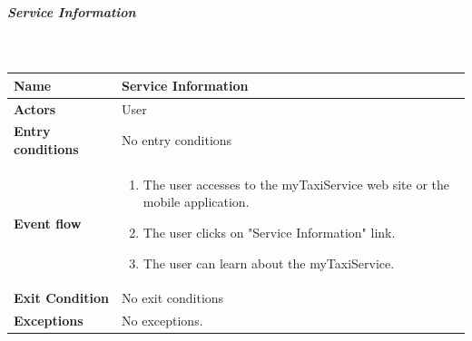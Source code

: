 		\newpage
		\subparagraph{Service Information}
		~\\[0.2cm]
		\vspace{20pt}
		\noindent
		\begin{tabular}{l l}
		 \textbf {Name} & Service Information  \\ \hline
		 \textbf{Actors} & User \\ \hline
		 \textbf{Entry conditions} & No entry conditions \\ \hline
		 \textbf{Event flow} & 
		 \parbox{0.7\textwidth}{
		 \begin{enumerate}
		 \item The user accesses to the myTaxiService web site or the mobile application.
		 \item The user clicks on "Service Information" link.
		 \item The user can learn about the myTaxiService.
		 \end{enumerate}
		 } \\ \hline
		 \textbf{Exit Condition} & No exit conditions \\ \hline
		 \textbf{Exceptions} & No exceptions.
		\end{tabular}
		
